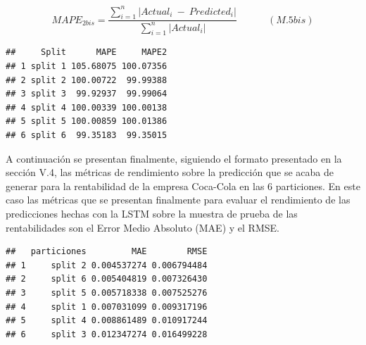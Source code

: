 \documentclass[]{DissertateUSU}
\begin{document}
\[MAPE_{2bis} = \frac{\sum_{i=1}^{n}\left |  Actual_i \ -\ Predicted_i\right |}{\sum_{i=1}^{n}\left |Actual_i \right |} \ \ \ \ \ \ \ \ \ \ \ \ \ \ (M.5bis)\]

\begin{verbatim}
##     Split      MAPE     MAPE2
## 1 split 1 105.68075 100.07356
## 2 split 2 100.00722  99.99388
## 3 split 3  99.92937  99.99064
## 4 split 4 100.00339 100.00138
## 5 split 5 100.00859 100.01386
## 6 split 6  99.35183  99.35015
\end{verbatim}

\noindent A continuación se presentan finalmente, siguiendo el formato
presentado en la sección V.4, las métricas de rendimiento sobre la
predicción que se acaba de generar para la rentabilidad de la empresa
Coca-Cola en las 6 particiones. En este caso las métricas que se
presentan finalmente para evaluar el rendimiento de las predicciones
hechas con la LSTM sobre la muestra de prueba de las rentabilidades son
el Error Medio Absoluto (MAE) y el RMSE.

\begin{verbatim}
##   particiones         MAE        RMSE
## 1     split 2 0.004537274 0.006794484
## 2     split 6 0.005404819 0.007326430
## 3     split 5 0.005718338 0.007525276
## 4     split 1 0.007031099 0.009317196
## 5     split 4 0.008861489 0.010917244
## 6     split 3 0.012347274 0.016499228
\end{verbatim}
\end{document}
